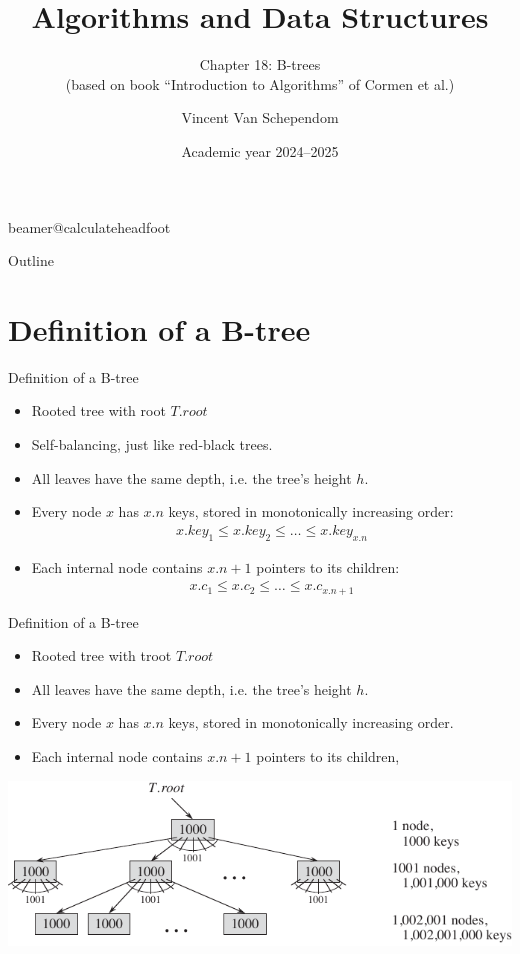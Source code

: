 \documentclass[11pt,t]{beamer}
\title[A\&D Chapter 18: B-trees]{Algorithms and Data Structures} %
\subtitle{Chapter 18: B-trees\\(based on book “Introduction to Algorithms” of Cormen et al.)}
\author{Vincent Van Schependom}
\institute{KU Leuven Campus Kulak Kortrijk}
\date{Academic year 2024--2025}
\begin{document}
	\csname beamer@calculateheadfoot\endcsname %


	\begin{frame}
		\titlepage
	\end{frame}


	\begin{frame}{Outline}
		\hfill	{\large \parbox{.961\textwidth}{\tableofcontents[hideothersubsections]}}
	\end{frame}

	\section{Definition of a B-tree}

	\begin{frame}{Definition of a B-tree}
		\begin{itemize}[<+->]
			\item Rooted tree with root \(T.root\)
			\item Self-balancing, just like red-black trees.
			\item All leaves have the same depth, i.e. the tree's height \(h\).
			\item Every node \(x\) has \(x.n\) keys, stored in monotonically increasing order: \onslide<+-> \begin{align*}
				{x.key_1 \leq x.key_2 \leq \ldots \leq x.key_{x.n}}
			\end{align*}
			\item Each internal node contains \(x.n+1\) pointers to its children:
				\onslide<+->\begin{align*}
				{x.c_1 \leq x.c_2 \leq \ldots \leq x.c_{x.n+1}}
			\end{align*}
		\end{itemize}
	\end{frame}

	\begin{frame}{Definition of a B-tree}
		\begin{itemize}
			\item Rooted tree with troot \(T.root\)
			\item All leaves have the same depth, i.e. the tree's height \(h\).
			\item Every node \(x\) has \(x.n\) keys, stored in monotonically increasing order.
			\item Each internal node contains \(x.n+1\) pointers to its children,
		\end{itemize}
		\centering
		\includegraphics{images/nodes_keys}
	\end{frame}
\end{document}
